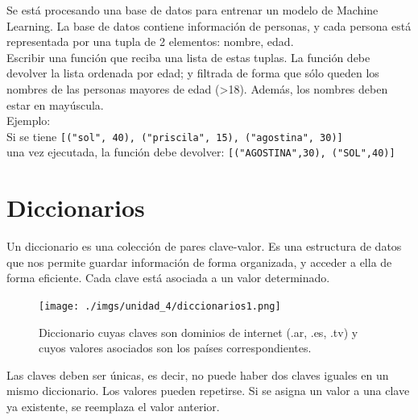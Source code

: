 \documentclass[
  letterpaper,
  DIV=11,
  numbers=noendperiod]{scrreprt}
\begin{document}
\begin{tcolorbox}[enhanced jigsaw, bottomrule=.15mm, leftrule=.75mm, opacityback=0, colback=white, toprule=.15mm, bottomtitle=1mm, opacitybacktitle=0.6, rightrule=.15mm, left=2mm, arc=.35mm, coltitle=black, title=\textcolor{quarto-callout-important-color}{\faExclamation}\hspace{0.5em}{Ejercicio Desafío}, breakable, toptitle=1mm, colframe=quarto-callout-important-color-frame, titlerule=0mm, colbacktitle=quarto-callout-important-color!10!white]

Se está procesando una base de datos para entrenar un modelo de Machine
Learning. La base de datos contiene información de personas, y cada
persona está representada por una tupla de 2 elementos: nombre, edad.\\
Escribir una función que reciba una lista de estas tuplas. La función
debe devolver la lista ordenada por edad; y filtrada de forma que sólo
queden los nombres de las personas mayores de edad (\textgreater18).
Además, los nombres deben estar en mayúscula.\\
Ejemplo:\\
Si se tiene
\texttt{{[}("sol",\ 40),\ ("priscila",\ 15),\ ("agostina",\ 30){]}}\\
una vez ejecutada, la función debe devolver:
\texttt{{[}("AGOSTINA",30),\ ("SOL",40){]}}

\end{tcolorbox}

\section{Diccionarios}\label{diccionarios}

Un diccionario es una colección de pares clave-valor. Es una estructura
de datos que nos permite guardar información de forma organizada, y
acceder a ella de forma eficiente. Cada clave está asociada a un valor
determinado.

\begin{figure}[H]

{\centering \texttt{[image: ./imgs/unidad\_4/diccionarios1.png]}

}

\caption{Diccionario cuyas claves son dominios de internet (.ar, .es,
.tv) y cuyos valores asociados son los países correspondientes.}

\end{figure}%

Las claves deben ser únicas, es decir, no puede haber dos claves iguales
en un mismo diccionario. Los valores pueden repetirse. Si se asigna un
valor a una clave ya existente, se reemplaza el valor anterior.
\end{document}

